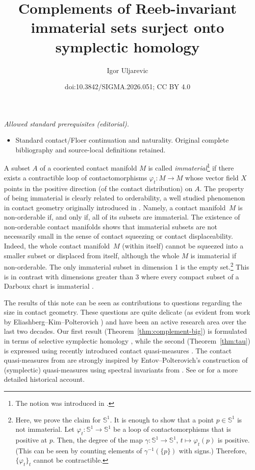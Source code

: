 \documentclass[10pt,a4paper]{amsart}
\title{Complements of Reeb-invariant immaterial sets surject onto symplectic homology}
\author{Igor Uljarevic}
\date{doi:10.3842/SIGMA.2026.051; CC BY 4.0}
\numberwithin{equation}{section}
\theoremstyle{definition}
\begin{document}
\maketitle
\noindent\textit{Allowed standard prerequisites (editorial).}\begin{itemize}
\item Standard contact/Floer continuation and naturality. Original complete bibliography and source-local definitions retained.
\end{itemize}\medskip

A subset $A$ of a cooriented contact manifold $M$ is called \emph{immaterial}\footnote{The notion was introduced in \cite[Section~7]{uljarevic2023selective}.} if there exists a contractible loop of contactomorphisms $\varphi_t\colon M\to M$ whose vector field $X$ points in the positive direction (of the contact distribution) on $A$.
The property of being immaterial is clearly related to orderability, a well studied phenomenon in contact geometry originally introduced in \cite{eliashberg2000partially}. Namely, a contact manifold~$M$ is non-orderable if, and only if, all of its subsets are immaterial. The existence of non-orderable contact manifolds shows that immaterial subsets are not necessarily small in the sense of contact squeezing or contact displaceability. Indeed, the whole contact manifold~$M$ (within itself) cannot be squeezed into a smaller subset or displaced from itself, although the whole $M$ is immaterial if non-orderable.
The only immaterial subset in dimension 1 is the empty set.\footnote{{Here, we prove the claim for $\mathbb{S}^1$. It is enough to show that a point $p\in\mathbb{S}^1$ is not immaterial. Let $\varphi_t\colon \mathbb{S}^1\to \mathbb{S}^1$ be a loop of contactomorphisms that is positive at $p$. Then, the degree of the map $\gamma\colon\mathbb{S}^1\to \mathbb{S}^1$, $t\mapsto \varphi_t(p)$ is positive. (This can be seen by counting elements of $\gamma^{-1}(\{p\})$ with signs.) Therefore, $\{\varphi_t\}_t$ cannot be contractible.}} This is in contrast with dimensions greater than 3 where every compact subset of a Darboux chart is immaterial \cite[Lemma~7.3]{uljarevic2023selective}.

{The results of this note can be seen as contributions to questions regarding the size in contact geometry. These questions are quite delicate (as evident from work by Eliashberg--Kim--Polterovich \cite{eliashberg2006geometry}) and have been an active research area over the last two decades. Our first result (Theorem~\ref{thm:complement-big}) is formulated in terms of selective symplectic homology \cite{uljarevic2023selective}, while the second (Theorem~\ref{thm:tau}) is expressed using recently introduced contact quasi-measures \cite{djordjevic2025quantitative}. The contact quasi-measures from \cite{djordjevic2025quantitative} are strongly inspired by Entov--Polterovich's construction of (symplectic) quasi-measures \cite{EP06} using spectral invariants from \cite{oh2004construction}. See \cite{Ent14} or \cite{polterovich2014function} for a more detailed historical account.}
\end{document}

